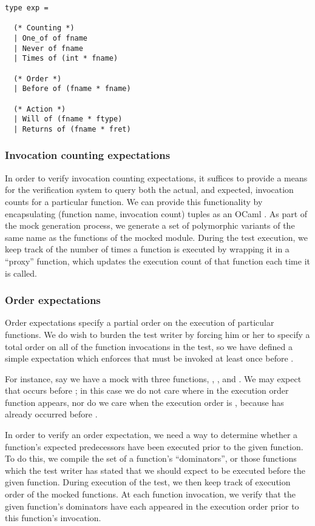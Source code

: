 \begin{lstlisting}[aboveskip=\baselineskip,
    caption=The expectation type,
    label=code:expect_type]
type exp =

  (* Counting *)
  | One_of of fname
  | Never of fname
  | Times of (int * fname)

  (* Order *)
  | Before of (fname * fname)

  (* Action *)
  | Will of (fname * ftype)
  | Returns of (fname * fret)
\end{lstlisting}

\subsubsection{Invocation counting expectations}

In order to verify invocation counting expectations, it suffices to
provide a means for the verification system to query both the actual,
and expected, invocation counts for a particular function. We can
provide this functionality by encapsulating (function name, invocation
count) tuples as an OCaml . As part of the mock generation
process, we generate a set of polymorphic variants of the same name as
the functions of the mocked module. During the test execution, we keep
track of the number of times a function is executed by wrapping it in
a ``proxy'' function, which updates the execution count of that
function each time it is called.

\subsubsection{Order expectations}

Order expectations specify a partial order on the execution of
particular functions. We do wish to burden the test writer by forcing
him or her to specify a total order on all of the function invocations
in the test, so we have defined a simple  expectation
which enforces that  must be invoked at least once before
.

For instance, say we have a mock with three functions, ,
, and . We may expect that  occurs before
; in this case we do not care where in the execution order
function  appears, nor do we care when the execution order is
, because  has already occurred before .

In order to verify an order expectation, we need a way to determine
whether a function's expected predecessors have been executed prior to
the given function. To do this, we compile the set of a function's
``dominators'', or those functions which the test writer has stated
that we should expect to be executed before the given function. During
execution of the test, we then keep track of execution order of the
mocked functions. At each function invocation, we verify that the
given function's dominators have each appeared in the execution order
prior to this function's invocation.

